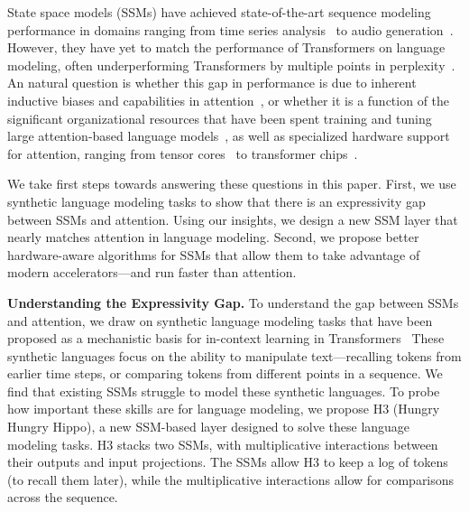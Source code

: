 State space models (SSMs) have achieved state-of-the-art sequence modeling performance in domains ranging from time series analysis~\citep{gu2022efficiently} to audio generation~\citep{goel2022s}. However, they have yet to match the performance of Transformers on language modeling, often underperforming Transformers by multiple points in perplexity~\citep{gu2022efficiently}. An natural question is whether this gap in performance is due to inherent inductive biases and capabilities in attention~\citep{edelman2022inductive,olsson2022context}, or whether it is a function of the significant organizational resources that have been spent training and tuning large attention-based language models~\citep{chowdhery2022palm,hoffmann2022training,zhang2022opt}, as well as specialized hardware support for attention, ranging from tensor cores~\citep{nvidia2017nvidia} to transformer chips~\citep{nvidia2022nvidia,kao2021optimized}.

We take first steps towards answering these questions in this paper. First, we use synthetic language modeling tasks to show that there is an expressivity gap between SSMs and attention. Using our insights, we design a new SSM layer that nearly matches attention in language modeling. Second, we propose better hardware-aware algorithms for SSMs that allow them to take advantage of modern accelerators---and run faster than attention.

\textbf{Understanding the Expressivity Gap.} To understand the gap between SSMs and attention, we draw on synthetic language modeling tasks that have been proposed as a mechanistic basis for in-context learning in Transformers~\citep{olsson2022context} These synthetic languages focus on the ability to manipulate text---recalling tokens from earlier time steps, or comparing tokens from different points in a sequence. We find that existing SSMs struggle to model these synthetic languages. To probe how important these skills are for language modeling, we propose \textsc{H3} (Hungry Hungry Hippo), a new SSM-based layer designed to solve these language modeling tasks.
\textsc{H3} stacks two SSMs, with multiplicative interactions between their outputs and input projections. The SSMs allow \textsc{H3} to keep a log of tokens (to recall them later), while the multiplicative interactions allow for comparisons across the sequence.

